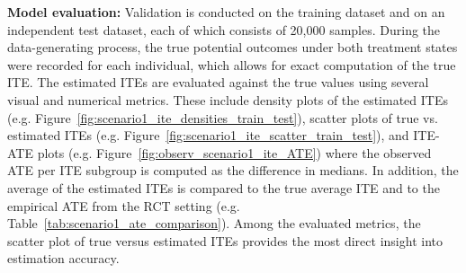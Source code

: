\FloatBarrier

\medskip

\textbf{Model evaluation:} Validation is conducted on the training dataset and on an independent test dataset, each of which consists of 20,000 samples. During the data-generating process, the true potential outcomes under both treatment states were recorded for each individual, which allows for exact computation of the true ITE. The estimated ITEs are evaluated against the true values using several visual and numerical metrics. These include density plots of the estimated ITEs (e.g. Figure~\ref{fig:scenario1_ite_densities_train_test}), scatter plots of true vs. estimated ITEs (e.g. Figure~\ref{fig:scenario1_ite_scatter_train_test}), and ITE-ATE plots (e.g. Figure~\ref{fig:observ_scenario1_ite_ATE}) where the observed ATE per ITE subgroup is computed as the difference in medians. In addition, the average of the estimated ITEs is compared to the true average ITE and to the empirical ATE from the RCT setting (e.g. Table~\ref{tab:scenario1_ate_comparison}). Among the evaluated metrics, the scatter plot of true versus estimated ITEs provides the most direct insight into estimation accuracy.














